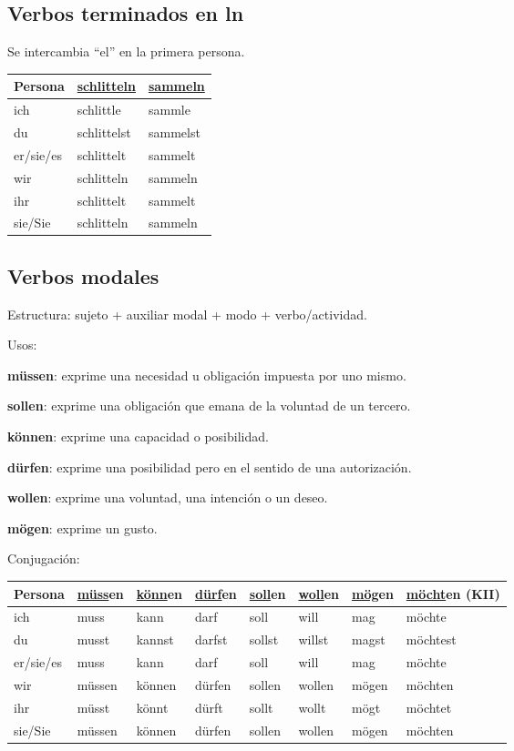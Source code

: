 \subsection{Verbos terminados en ln}
Se intercambia ``el'' en la primera persona.

\begin{tabular}{| l | l l |}
\hline
\textbf{Persona} & \textbf{\underline{schlitteln}} & \textbf{\underline{sammeln}}\\
\hline
ich & schlittle & sammle \\
du & schlittelst & sammelst \\
er/sie/es & schlittelt & sammelt \\
wir & schlitteln & sammeln \\
ihr  & schlittelt & sammelt \\
sie/Sie & schlitteln & sammeln \\
\hline
\end{tabular}


\subsection{Verbos modales}
Estructura: sujeto + auxiliar modal + modo + verbo/actividad.

Usos:
\begin{myitemize}
\item \textbf{müssen}: exprime una necesidad u obligación impuesta por uno mismo.
\item \textbf{sollen}: exprime una obligación que emana de la voluntad de un tercero.
\item \textbf{können}: exprime una capacidad o posibilidad.
\item \textbf{dürfen}: exprime una posibilidad pero en el sentido de una autorización.
\item \textbf{wollen}: exprime una voluntad, una intención o un deseo.
\item \textbf{mögen}: exprime un gusto.
\end{myitemize}

Conjugación:

\begin{tabular}{| l | l | l | l | l | l | l | l |}
\hline
\textbf{Persona} & \textbf{\underline{müss}en} & \textbf{\underline{könn}en} & \textbf{\underline{dürf}en} & \textbf{\underline{soll}en} &\textbf{\underline{woll}en} & \textbf{\underline{mög}en} & \textbf{\underline{möcht}en (KII)}\\
\hline
ich & muss & kann & darf & soll & will & mag & möchte \\
du & musst & kannst & darfst & sollst & willst & magst & möchtest\\
er/sie/es & muss & kann & darf & soll & will & mag & möchte \\
wir & müssen & können  & dürfen & sollen & wollen & mögen & möchten \\
ihr  & müsst & könnt & dürft & sollt & wollt & mögt & möchtet \\
sie/Sie & müssen & können & dürfen & sollen & wollen & mögen & möchten \\
\hline
\end{tabular}

